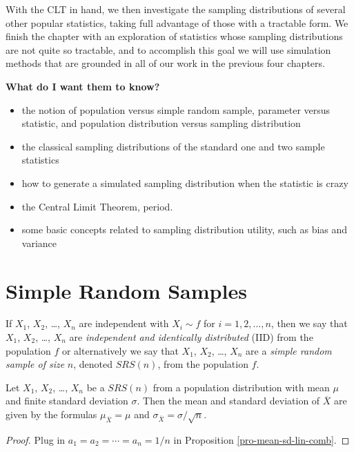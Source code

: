 With the CLT in hand, we then investigate the sampling distributions
of several other popular statistics, taking full advantage of those
with a tractable form. We finish the chapter with an exploration of
statistics whose sampling distributions are not quite so tractable,
and to accomplish this goal we will use simulation methods that are
grounded in all of our work in the previous four chapters.

\textbf{What do I want them to know?}
\begin{itemize}
\item the notion of population versus simple random sample, parameter
versus statistic, and population distribution versus sampling
distribution
\item the classical sampling distributions of the standard one and two
sample statistics
\item how to generate a simulated sampling distribution when the statistic
is crazy
\item the Central Limit Theorem, period.
\item some basic concepts related to sampling distribution utility, such
as bias and variance
\end{itemize}

\section{Simple Random Samples}
\label{sec-8-1}

\begin{defn}
If \(X_{1}\), \(X_{2}\), \ldots{}, \(X_{n}\) are independent with
\(X_{i}\sim f\) for \(i=1,2,\ldots,n\), then we say that \(X_{1}\),
\(X_{2}\), \ldots{}, \(X_{n}\) are \emph{independent and identically
distributed} (IID) from the population \(f\) or alternatively we say
that \(X_{1}\), \(X_{2}\), \ldots{}, \(X_{n}\) are a \emph{simple random sample
of size} \(n\), denoted \(SRS(n)\), from the population \(f\).
\end{defn}

\begin{prop}
\label{pro-mean-sd-xbar} Let \(X_{1}\), \(X_{2}\), \ldots{}, \(X_{n}\) be a
\(SRS(n)\) from a population distribution with mean \(\mu\) and finite
standard deviation \(\sigma\). Then the mean and standard deviation of
\(\overline{X}\) are given by the formulas \(\mu_{\overline{X}}=\mu\)
and \(\sigma_{\overline{X}}=\sigma/\sqrt{n}\).
\end{prop}

\begin{proof}
Plug in \(a_{1}=a_{2}=\cdots=a_{n}=1/n\) in Proposition
\ref{pro-mean-sd-lin-comb}.
\end{proof}

